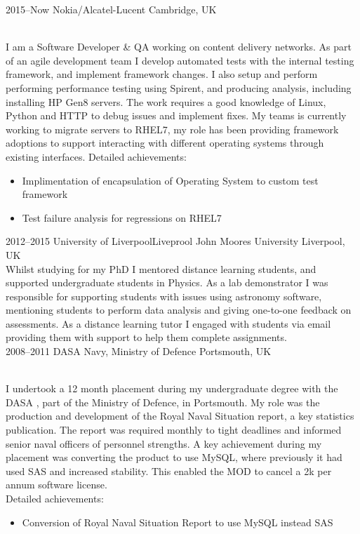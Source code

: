 \documentclass[]{cv-style}          %
\begin{document}
\begin{entrylist}
\entry
  {2015--Now}
  {Nokia/Alcatel-Lucent}
  {Cambridge, UK}
  {\\
  I am a Software Developer \& QA working on content delivery networks. As part of an agile development team I develop automated tests with the internal testing framework, and implement framework changes. I also setup and perform performing performance testing using Spirent, and producing analysis, including installing HP Gen8 servers. The work requires a good knowledge of Linux, Python and HTTP to debug issues and implement fixes. My teams is currently working to migrate servers to RHEL7, my role has been providing framework adoptions to support interacting with different operating systems through existing interfaces. 
Detailed achievements:
\begin{itemize}
  \item Implimentation of encapsulation of Operating System to custom test framework 
  \item Test failure analysis for regressions on RHEL7
\end{itemize}
}
\entry
  {2012--2015}
  {University of Liverpool\/Liveprool John Moores University}
  {Liverpool, UK}
  {\\
  Whilst studying for my PhD I mentored distance learning students, and supported undergraduate students in Physics. As a lab demonstrator I was responsible for supporting students with issues using astronomy software, mentioning students to perform data analysis and giving one-to-one feedback on assessments.  As a distance learning tutor I engaged with students via email providing them with support to help them complete assignments.\\
  }
\entry
  {2008--2011}
  {DASA Navy, Ministry of Defence}
  {Portsmouth, UK}
  {\\
  I undertook a 12 month placement during my undergraduate degree with the DASA , part of the Ministry of Defence, in Portsmouth. My role was the production and development of the Royal Naval Situation report, a key statistics publication. The report was required monthly to tight deadlines and informed senior naval officers of personnel strengths. A key achievement during my placement was converting the product to use MySQL, where previously it had used SAS and increased stability. This enabled the MOD to cancel a 2k per annum software license.\\
  Detailed achievements:
  \begin{itemize}
    \item Conversion of Royal Naval Situation Report to use MySQL instead SAS
  \end{itemize}
  }
\end{entrylist}
\end{document}

